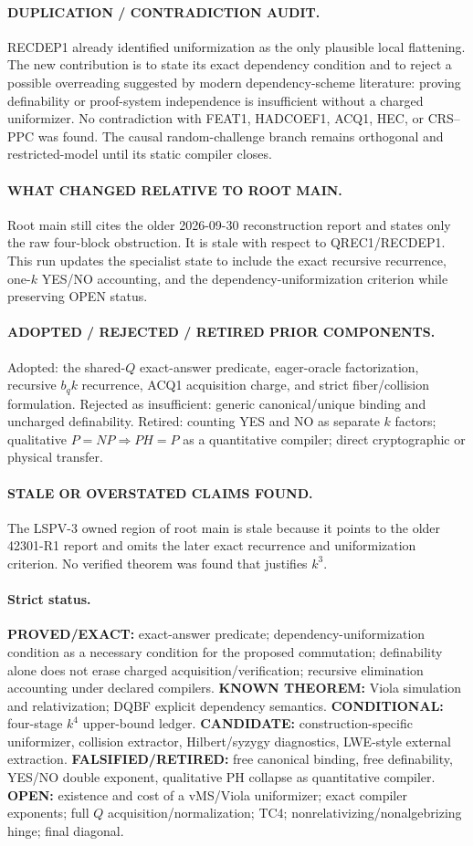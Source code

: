 \documentclass[11pt]{article}
\begin{document}
\paragraph{DUPLICATION / CONTRADICTION AUDIT.} RECDEP1 already identified uniformization as the only plausible local flattening. The new contribution is to state its exact dependency condition and to reject a possible overreading suggested by modern dependency-scheme literature: proving definability or proof-system independence is insufficient without a charged uniformizer. No contradiction with FEAT1, HADCOEF1, ACQ1, HEC, or CRS--PPC was found. The causal random-challenge branch remains orthogonal and restricted-model until its static compiler closes.
\paragraph{WHAT CHANGED RELATIVE TO ROOT MAIN.} Root main still cites the older 2026-09-30 reconstruction report and states only the raw four-block obstruction. It is stale with respect to QREC1/RECDEP1. This run updates the specialist state to include the exact recursive recurrence, one-$k$ YES/NO accounting, and the dependency-uniformization criterion while preserving OPEN status.
\paragraph{ADOPTED / REJECTED / RETIRED PRIOR COMPONENTS.} Adopted: the shared-$Q$ exact-answer predicate, eager-oracle factorization, recursive $b_qk$ recurrence, ACQ1 acquisition charge, and strict fiber/collision formulation. Rejected as insufficient: generic canonical/unique binding and uncharged definability. Retired: counting YES and NO as separate $k$ factors; qualitative $P=NP\Rightarrow PH=P$ as a quantitative compiler; direct cryptographic or physical transfer.
\paragraph{STALE OR OVERSTATED CLAIMS FOUND.} The LSPV-3 owned region of root main is stale because it points to the older 42301-R1 report and omits the later exact recurrence and uniformization criterion. No verified theorem was found that justifies $k^3$.
\paragraph{Strict status.} \textbf{PROVED/EXACT:} exact-answer predicate; dependency-uniformization condition as a necessary condition for the proposed commutation; definability alone does not erase charged acquisition/verification; recursive elimination accounting under declared compilers. \textbf{KNOWN THEOREM:} Viola simulation and relativization; DQBF explicit dependency semantics. \textbf{CONDITIONAL:} four-stage $k^4$ upper-bound ledger. \textbf{CANDIDATE:} construction-specific uniformizer, collision extractor, Hilbert/syzygy diagnostics, LWE-style external extraction. \textbf{FALSIFIED/RETIRED:} free canonical binding, free definability, YES/NO double exponent, qualitative PH collapse as quantitative compiler. \textbf{OPEN:} existence and cost of a vMS/Viola uniformizer; exact compiler exponents; full $Q$ acquisition/normalization; TC4; nonrelativizing/nonalgebrizing hinge; final diagonal.
\end{document}
